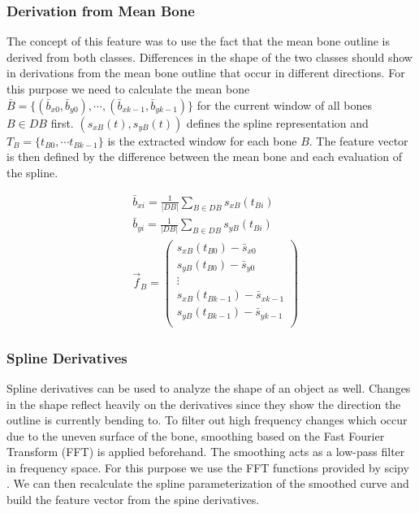 \documentclass[pdftex,12pt,a4paper]{report}
\begin{document}
\subsubsection{Derivation from Mean Bone}

The concept of this feature was to use the fact that the mean bone outline is derived from both classes.
Differences in the shape of the two classes should show in derivations from the mean bone outline that
occur in different directions. For this purpose we need to calculate the mean bone $\bar{B} = \{ (\bar{b}_{x0}, \bar{b}_{y0}), \cdots, (\bar{b}_{xk-1}, \bar{b}_{yk-1}) \}$ for the current window of all bones $B \in DB$ first. $(s_{xB}(t), s_{yB}(t))$ defines the spline representation and $T_B = \{ t_{B0}, \cdots t_{Bk-1} \}$ is the extracted window for each bone $B$. The feature vector is then defined by the difference between the mean bone and
each evaluation of the spline.

\begin{equation}
\begin{split}
& \bar{b}_{xi} = \frac{1}{|DB|} \sum_{B \in DB} s_{xB}(t_{Bi}) \\
& \bar{b}_{yi} = \frac{1}{|DB|} \sum_{B \in DB} s_{yB}(t_{Bi}) \\
& \vec{f}_B = \left( \begin{array}{c}
s_{xB}(t_{B0}) - \bar{s}_{x0} \\
s_{yB}(t_{B0}) - \bar{s}_{y0} \\
\vdots \\
s_{xB}(t_{Bk-1}) - \bar{s}_{xk-1} \\
s_{yB}(t_{Bk-1}) - \bar{s}_{yk-1} \\
\end{array} \right)  
\end{split}
\end{equation}

\subsubsection{Spline Derivatives}

Spline derivatives can be used to analyze the shape of an object as well. Changes in the shape reflect heavily
on the derivatives since they show the direction the outline is currently bending to. To filter out high frequency
changes which occur due to the uneven surface of the bone, smoothing based on the Fast Fourier Transform (FFT) is applied
beforehand. The smoothing acts as a low-pass filter in frequency space. For this purpose we use the FFT functions provided by scipy \cite{oliphant2007python}. We can then recalculate the spline parameterization of the smoothed curve and build the feature vector from the spine derivatives.
\end{document}
